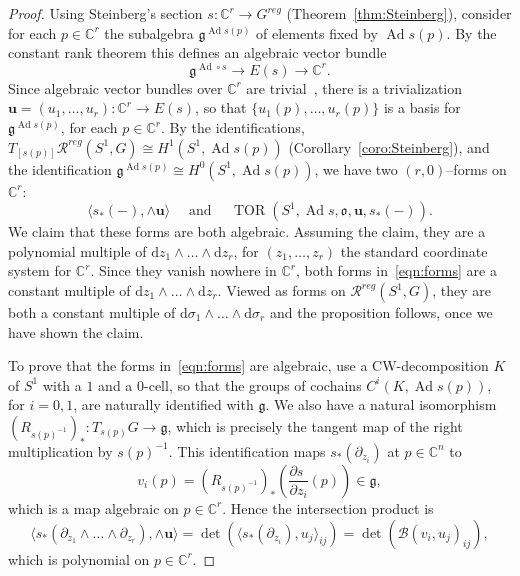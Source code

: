 \documentclass[11pt]{article}
\theoremstyle{definition}
\numberwithin{equation}{section}
\numberwithin{figure}{section}
\numberwithin{table}{section}
\DeclareMathOperator{\TOR}{TOR}
\DeclareMathOperator{\Ad}{Ad}
\newcommand{\Bcal}{\mathcal{B}}
\newcommand{\Rcal}{\mathcal{R}}
\newcommand{\Cbb}{\mathbb{C}}
\newcommand{\gfrk}{\mathfrak{g}}
\newcommand{\ofrk}{\mathfrak{o}}
\newcommand{\ubf}{\mathbf{u}}
\newcommand*{\dd}{\mathrm{d}}
\begin{document}
\begin{proof}
Using Steinberg's section $s\colon \Cbb^r\to G^{reg}$ (Theorem~\ref{thm:Steinberg}), consider for each $p\in\Cbb^r$ the subalgebra $\gfrk^{\Ad s(p) }$ of elements fixed by $ {\Ad s(p)} $. By the constant rank theorem this defines an algebraic vector bundle
\[
\gfrk^{\Ad\circ s} \to E(s)\to \Cbb^r.
\]
Since algebraic vector bundles over $\Cbb^r$ are trivial~\cite{Quillen,Suslin}, there is a trivialization $\ubf=(u_1,\dots,u_r)\colon \Cbb^r\to E(s)$, so that $\{ u_1(p),\dots,u_r(p)\}$ is a basis for $\gfrk^{\Ad s(p)}$, for each $p\in\Cbb^r$. By the identifications, $ T_{[s(p)]}\Rcal^ {reg}(S^ 1, G) \cong H^1(S^1,\Ad s(p))$ (Corollary~\ref{coro:Steinberg}), and the identification $\gfrk^{\Ad s(p)} \cong H^0(S^1,\Ad s(p)) $, we have two $(r,0)$--forms on $\Cbb^r$:
\begin{equation}\label{eqn:forms}
\langle s_*(-), \wedge \ubf \rangle \quad\text{ and } \quad
\TOR(S^1,\Ad s, \ofrk, \ubf,s_*(-)).
\end{equation}
We claim that these forms are both algebraic. Assuming the claim, they are a polynomial multiple of $\dd z_1\wedge\dots\wedge \dd z_r$, for $(z_1,\dots,z_r)$ the standard coordinate system for $\Cbb^r$. Since they vanish nowhere in $\Cbb^r$, both forms in~\eqref{eqn:forms} are a constant multiple of $\dd z_1\wedge\dots\wedge \dd z_r$. Viewed as forms on $\Rcal^{reg}(S^1, G)$, they are both a constant multiple of $\dd\sigma_1\wedge\dots \wedge \dd\sigma_r$ and the proposition follows, once we have shown the claim.


To prove that the forms in~\eqref{eqn:forms} are algebraic, use a CW-decomposition $K$ of $S^1$ with a $1$ and a $0$-cell, so that the groups of cochains $C^i(K,\Ad s(p))$, for $i=0,1$, are naturally identified with $\gfrk$. We also have a natural isomorphism $
(R_{s(p)^{-1}})_*\colon T_{s(p)} G\to \gfrk$, which is precisely the tangent map of the right multiplication by $s(p)^{-1} $. This identification maps $s_*(\partial_{z_i})$ at $p\in\Cbb^n$ to
\[
v_i(p) = \left(R_{ s(p)^{-1}}\right)_* \left(\frac{\partial s_{\phantom{i}}}{\partial {z_i}}(p) \right) \in\gfrk,
\]
which is a map algebraic on $p\in\Cbb^r$. Hence the intersection product is
\[
\langle s_*(\partial_{z_1}\wedge\dots\wedge \partial_{z_r}),\wedge \ubf \rangle=
\det (\langle s_*(\partial_{z_i}), u_j\rangle_{ij})= \det(\Bcal(v_i, u_j)_{ij}),
\]
which is polynomial on $p\in\Cbb^r$.


\end{proof}
\end{document}
